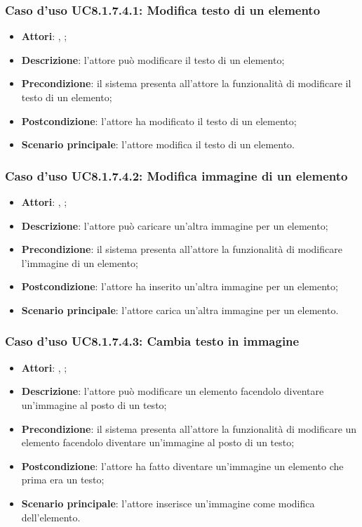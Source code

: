 		\subsubsection{Caso d'uso UC8.1.7.4.1: Modifica testo di un elemento}
		\begin{itemize}
			\item \textbf{Attori}: \uau, \uaupro;
			\item \textbf{Descrizione}: l'attore può modificare il testo di un elemento;
			\item \textbf{Precondizione}: il sistema presenta all'attore la funzionalità di modificare il testo di un elemento;
			\item \textbf{Postcondizione}: l'attore ha modificato il testo di un elemento;
			\item \textbf{Scenario principale}: l'attore modifica il testo di un elemento.  
		\end{itemize}
		
		\subsubsection{Caso d'uso UC8.1.7.4.2: Modifica immagine di un elemento}
		\begin{itemize}
			\item \textbf{Attori}: \uau, \uaupro;
			\item \textbf{Descrizione}: l'attore può caricare un'altra immagine per un elemento;
			\item \textbf{Precondizione}: il sistema presenta all'attore la funzionalità di modificare l'immagine di un elemento; 
			\item \textbf{Postcondizione}: l'attore ha inserito un'altra immagine per un elemento;
			\item \textbf{Scenario principale}: l'attore carica un'altra immagine per un elemento.
		\end{itemize}
		
		\subsubsection{Caso d'uso UC8.1.7.4.3: Cambia testo in immagine}
		\begin{itemize}
			\item \textbf{Attori}: \uau, \uaupro;
			\item \textbf{Descrizione}: l'attore può modificare un elemento facendolo diventare un'immagine al posto di un testo;
			\item \textbf{Precondizione}: il sistema presenta all'attore la funzionalità di modificare un elemento facendolo diventare un'immagine al posto di un testo;
			\item \textbf{Postcondizione}: l'attore ha fatto diventare un'immagine un elemento che prima era un testo;
			\item \textbf{Scenario principale}: l'attore inserisce un'immagine come modifica dell'elemento.  
		\end{itemize}
		
